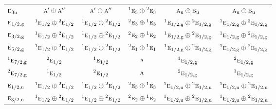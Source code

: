 \documentclass[10pt,a4paper]{article}
\numberwithin{equation}{section}
\newcommand{\irr}[1]{\text{\normalfont\scshape #1}}
\newcommand{\conjpair}[1]{{}^{#1}}
\newcommand{\ptag}[1]{\mathrm{#1}}
\begin{document}
{\begin{longtable}{@{}lccccc@{}}
$\irr{e}_{3\ptag{u}}$ & $\irr{a}'\oplus \irr{a}''$ & $\irr{a}'\oplus \irr{a}''$ & $\conjpair{1}\irr{e}_{3}\oplus \conjpair{2}\irr{e}_{3}$ & $\irr{a}_{\ptag{u}}\oplus \irr{b}_{\ptag{u}}$ & $\irr{a}_{\ptag{u}}\oplus \irr{b}_{\ptag{u}}$\\
$\irr{e}_{1/2,\ptag{g}}$ & $\conjpair{1}\irr{e}_{1/2}\oplus \conjpair{2}\irr{e}_{1/2}$ & $\conjpair{1}\irr{e}_{1/2}\oplus \conjpair{2}\irr{e}_{1/2}$ & $\conjpair{2}\irr{e}_{3}\oplus \conjpair{1}\irr{e}_{3}$ & $\conjpair{1}\irr{e}_{1/2,\ptag{g}}\oplus \conjpair{2}\irr{e}_{1/2,\ptag{g}}$ & $\conjpair{1}\irr{e}_{1/2,\ptag{g}}\oplus \conjpair{2}\irr{e}_{1/2,\ptag{g}}$\\
$\irr{e}_{3/2,\ptag{g}}$ & $\conjpair{1}\irr{e}_{1/2}\oplus \conjpair{2}\irr{e}_{1/2}$ & $\conjpair{1}\irr{e}_{1/2}\oplus \conjpair{2}\irr{e}_{1/2}$ & $\conjpair{2}\irr{e}_{2}\oplus \conjpair{1}\irr{e}_{2}$ & $\conjpair{1}\irr{e}_{1/2,\ptag{g}}\oplus \conjpair{2}\irr{e}_{1/2,\ptag{g}}$ & $\conjpair{1}\irr{e}_{1/2,\ptag{g}}\oplus \conjpair{2}\irr{e}_{1/2,\ptag{g}}$\\
$\irr{e}_{5/2,\ptag{g}}$ & $\conjpair{1}\irr{e}_{1/2}\oplus \conjpair{2}\irr{e}_{1/2}$ & $\conjpair{1}\irr{e}_{1/2}\oplus \conjpair{2}\irr{e}_{1/2}$ & $\conjpair{2}\irr{e}_{1}\oplus \conjpair{1}\irr{e}_{1}$ & $\conjpair{1}\irr{e}_{1/2,\ptag{g}}\oplus \conjpair{2}\irr{e}_{1/2,\ptag{g}}$ & $\conjpair{1}\irr{e}_{1/2,\ptag{g}}\oplus \conjpair{2}\irr{e}_{1/2,\ptag{g}}$\\
$\conjpair{1}\irr{e}_{7/2,\ptag{g}}$ & $\conjpair{2}\irr{e}_{1/2}$ & $\conjpair{1}\irr{e}_{1/2}$ & $\irr{a}$ & $\conjpair{1}\irr{e}_{1/2,\ptag{g}}$ & $\conjpair{2}\irr{e}_{1/2,\ptag{g}}$\\
$\conjpair{2}\irr{e}_{7/2,\ptag{g}}$ & $\conjpair{1}\irr{e}_{1/2}$ & $\conjpair{2}\irr{e}_{1/2}$ & $\irr{a}$ & $\conjpair{2}\irr{e}_{1/2,\ptag{g}}$ & $\conjpair{1}\irr{e}_{1/2,\ptag{g}}$\\
$\irr{e}_{1/2,\ptag{u}}$ & $\conjpair{1}\irr{e}_{1/2}\oplus \conjpair{2}\irr{e}_{1/2}$ & $\conjpair{1}\irr{e}_{1/2}\oplus \conjpair{2}\irr{e}_{1/2}$ & $\conjpair{2}\irr{e}_{3}\oplus \conjpair{1}\irr{e}_{3}$ & $\conjpair{1}\irr{e}_{1/2,\ptag{u}}\oplus \conjpair{2}\irr{e}_{1/2,\ptag{u}}$ & $\conjpair{1}\irr{e}_{1/2,\ptag{u}}\oplus \conjpair{2}\irr{e}_{1/2,\ptag{u}}$\\
$\irr{e}_{3/2,\ptag{u}}$ & $\conjpair{1}\irr{e}_{1/2}\oplus \conjpair{2}\irr{e}_{1/2}$ & $\conjpair{1}\irr{e}_{1/2}\oplus \conjpair{2}\irr{e}_{1/2}$ & $\conjpair{2}\irr{e}_{2}\oplus \conjpair{1}\irr{e}_{2}$ & $\conjpair{1}\irr{e}_{1/2,\ptag{u}}\oplus \conjpair{2}\irr{e}_{1/2,\ptag{u}}$ & $\conjpair{1}\irr{e}_{1/2,\ptag{u}}\oplus \conjpair{2}\irr{e}_{1/2,\ptag{u}}$\\

\end{longtable}}
\end{document}
